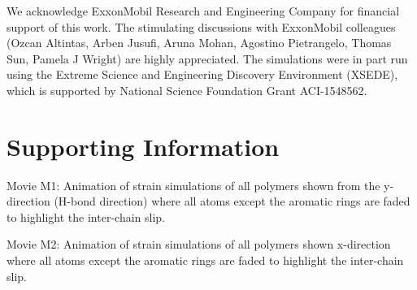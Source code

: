 \documentclass[journal=langd5,manuscript=article]{achemso}
\newcommand{\beginsupplement}{%
        \setcounter{table}{0}
        \setlength{\tabcolsep}{10pt}
        \setlength{\arrayrulewidth}{1mm}%
        \renewcommand{\arraystretch}{1.5}
        \renewcommand{\thetable}{S\arabic{table}}%
        \setcounter{figure}{0}
        \renewcommand{\thefigure}{S\arabic{figure}}%
     }
\begin{document}
%
\begin{acknowledgement}
We acknowledge ExxonMobil Research and Engineering Company for financial support of this work. The stimulating discussions with ExxonMobil colleagues (Ozcan Altintas, Arben Jusufi, Aruna Mohan, Agostino Pietrangelo, Thomas Sun, Pamela J Wright) are highly appreciated. The simulations were in part run using the Extreme Science and Engineering Discovery Environment (XSEDE), which is supported by National Science Foundation Grant ACI-1548562.
\end{acknowledgement}


\FloatBarrier


\pagebreak

\beginsupplement

\section{Supporting Information}

Movie M1: Animation of strain simulations of all polymers shown from the y-direction (H-bond direction) where all atoms except the aromatic rings are faded to highlight the inter-chain slip.

\noindent Movie M2: Animation of strain simulations of all polymers shown x-direction where all atoms except the aromatic rings are faded to highlight the inter-chain slip.
\end{document}
